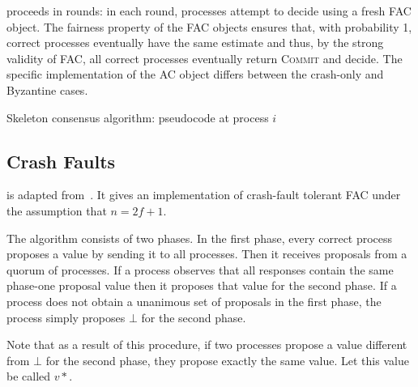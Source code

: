 proceeds in rounds: in each round, processes attempt to decide using a fresh FAC object. The fairness property of the FAC objects ensures that, with probability 1, correct processes eventually have the same estimate and thus, by the strong validity of FAC, all correct processes eventually return \textsc{Commit} and decide. The specific implementation of the AC object differs between the crash-only and Byzantine cases.

\begin{algorithm}
\caption{Skeleton consensus algorithm: pseudocode at process $i$}
\label{alg:skeleton}
\end{algorithm}

\subsection{Crash Faults}

 is adapted from~\cite{book}. It gives an implementation of crash-fault tolerant FAC under the assumption that $n=2f+1$.

The algorithm consists of two
phases. In the first phase, every correct process proposes a value by sending it to
all processes. Then it receives proposals from
a quorum of processes. If a process observes that all responses contain the same
phase-one proposal value then it proposes that value for the second phase. If a process does not obtain a unanimous set of proposals in the first phase, the process simply proposes $\bot$ for the second phase.

Note that as a result of this procedure, if two processes propose a value different from $\bot$ for the second phase, they propose exactly the same value.
Let this value be called $v*$.

